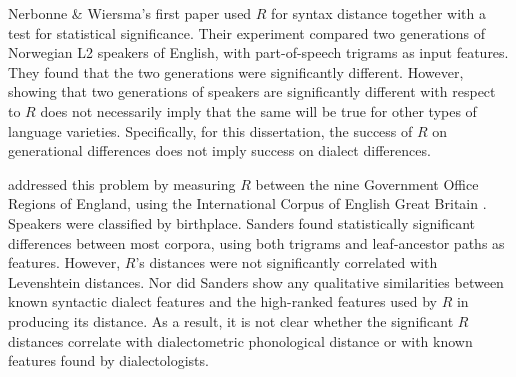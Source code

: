 \documentclass[11pt,letterpaper]{article}
\begin{document}
Nerbonne \& Wiersma's first paper used $R$ for syntax distance
together with a test for statistical significance\cite{nerbonne06}.
Their experiment compared two generations of Norwegian L2 speakers of
English, with part-of-speech trigrams as input features.  They found
that the two generations were significantly different. However,
showing that two generations of speakers are significantly different
with respect to $R$ does not necessarily imply that the same will be
true for other types of language varieties. Specifically, for this
dissertation, the success of $R$ on generational differences does not
imply success on dialect differences.

 addressed this problem by measuring $R$ between
the nine Government Office Regions of England, using the International
Corpus of English Great Britain \cite{nelson02}. Speakers were
classified by birthplace. Sanders found statistically significant
differences between most corpora, using both trigrams and
leaf-ancestor paths as features. However, $R$'s distances were not
significantly correlated with Levenshtein distances. Nor did Sanders
show any qualitative similarities between known syntactic dialect
features and the high-ranked features used by $R$ in producing its
distance. As a result, it is not clear whether the significant $R$
distances correlate with dialectometric phonological distance or with
known features found by dialectologists.




\end{document}

